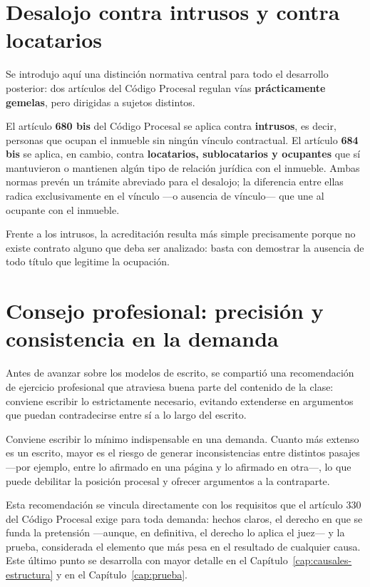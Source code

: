 \documentclass[12pt,oneside]{book}
\begin{document}
\section{Desalojo contra intrusos y contra locatarios}

Se introdujo aquí una distinción normativa central para todo el desarrollo posterior: dos artículos del Código Procesal regulan vías \textbf{prácticamente gemelas}, pero dirigidas a sujetos distintos.

\begin{important}
El artículo \textbf{680 bis} del Código Procesal se aplica contra \textbf{intrusos}, es decir, personas que ocupan el inmueble sin ningún vínculo contractual. El artículo \textbf{684 bis} se aplica, en cambio, contra \textbf{locatarios, sublocatarios y ocupantes} que sí mantuvieron o mantienen algún tipo de relación jurídica con el inmueble. Ambas normas prevén un trámite abreviado para el desalojo; la diferencia entre ellas radica exclusivamente en el vínculo ---o ausencia de vínculo--- que une al ocupante con el inmueble.
\end{important}

Frente a los intrusos, la acreditación resulta más simple precisamente porque no existe contrato alguno que deba ser analizado: basta con demostrar la ausencia de todo título que legitime la ocupación.

\section{Consejo profesional: precisión y consistencia en la demanda}

Antes de avanzar sobre los modelos de escrito, se compartió una recomendación de ejercicio profesional que atraviesa buena parte del contenido de la clase: conviene escribir lo estrictamente necesario, evitando extenderse en argumentos que puedan contradecirse entre sí a lo largo del escrito.

\begin{important}
Conviene escribir lo mínimo indispensable en una demanda. Cuanto más extenso es un escrito, mayor es el riesgo de generar inconsistencias entre distintos pasajes ---por ejemplo, entre lo afirmado en una página y lo afirmado en otra---, lo que puede debilitar la posición procesal y ofrecer argumentos a la contraparte.
\end{important}

Esta recomendación se vincula directamente con los requisitos que el artículo 330 del Código Procesal exige para toda demanda: hechos claros, el derecho en que se funda la pretensión ---aunque, en definitiva, el derecho lo aplica el juez--- y la prueba, considerada el elemento que más pesa en el resultado de cualquier causa. Este último punto se desarrolla con mayor detalle en el Capítulo~\ref{cap:causales-estructura} y en el Capítulo~\ref{cap:prueba}.
\end{document}
